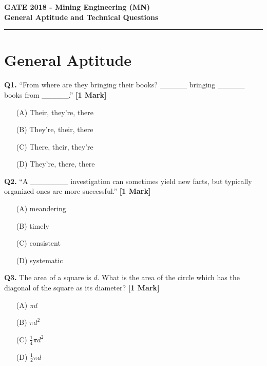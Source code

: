 \documentclass[11pt]{article}
\newcommand{\questiona}[2]{
    \noindent\textbf{Q#2.} #1 \hfill \textbf{[1 Mark]}
}
\begin{document}
\begin{center}
    \Large\textbf{GATE 2018 - Mining Engineering (MN)} \\
    \large\textbf{General Aptitude and Technical Questions} \\
    \rule{\textwidth}{0.5pt} %
\end{center}

\vspace{0.5cm}

\section*{General Aptitude}

\questiona{“From where are they bringing their books? \_\_\_\_\_ bringing \_\_\_\_\_ books from \_\_\_\_\_.”}{1}
\begin{enumerate}
    \item[(A)] Their, they’re, there  
    \item[(B)] They’re, their, there  
    \item[(C)] There, their, they’re  
    \item[(D)] They’re, there, there  
\end{enumerate}
\vspace{0.5cm}

\questiona{“A \_\_\_\_\_\_\_ investigation can sometimes yield new facts, but typically organized ones are more successful.”}{2}
\begin{enumerate}
    \item[(A)] meandering  
    \item[(B)] timely  
    \item[(C)] consistent  
    \item[(D)] systematic  
\end{enumerate}
\vspace{0.5cm}

\questiona{The area of a square is \(d\). What is the area of the circle which has the diagonal of the square as its diameter?}{3}
\begin{enumerate}
    \item[(A)] \(\pi d\)  
    \item[(B)] \(\pi d^2\)  
    \item[(C)] \(\frac{1}{4} \pi d^2\)  
    \item[(D)] \(\frac{1}{2} \pi d\)  
\end{enumerate}
\vspace{0.5cm}
\end{document}
